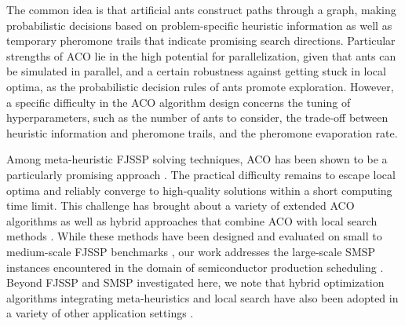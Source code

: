 


The common idea is that artificial ants construct paths through a graph,
making probabilistic decisions based on problem-specific heuristic information as well as temporary pheromone trails that indicate
promising search directions.
Particular strengths of ACO lie in the high potential for parallelization,
given that ants can be simulated in parallel,
and a certain robustness against getting stuck in local optima,
as the probabilistic decision rules of ants promote exploration.
However, a specific difficulty in the ACO algorithm design concerns the
tuning of hyperparameters, such as the number of ants to consider,
the trade-off between heuristic information and pheromone trails, and
the pheromone evaporation rate. 

Among meta-heuristic FJSSP solving techniques,
ACO has been shown to be a particularly promising approach \cite{turkyilmaz2020research}.
The practical difficulty remains to escape local optima and reliably
converge to high-quality solutions within a short computing time limit.
This challenge has brought about a variety of extended ACO algorithms as well as
hybrid approaches that combine ACO with local search methods
\cite{leung2010integrated,li2010improved,xing2010knowledge,thammano2013hybrid,arnaout2014two,el2017dual}.
While these methods have been designed and evaluated
on small to medium-scale FJSSP benchmarks \cite{arnaout2014two},
our work addresses the large-scale SMSP instances encountered in
the domain of semiconductor production scheduling \cite{kopp2020smt2020}.
Beyond FJSSP and SMSP investigated here,
we note that hybrid optimization algorithms integrating meta-heuristics and
local search have also been adopted in a variety of other application settings
\cite{abdel2021hybrid,fontes2023hybrid,li2021hybrid,mohd2023improved,suid2023novel}.

